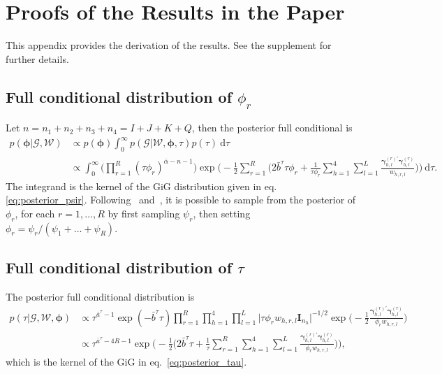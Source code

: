 \documentclass[12pt,a4paper]{article}
\newcommand*\abs[1]{\big|#1\big|}					%
\theoremstyle{custom}
\begin{document}
\section{Proofs of the Results in the Paper} \label{sec:apdx_proofs}
This appendix provides the derivation of the results. See the supplement for further details.

\subsection{Full conditional distribution of $\phi_r$} \label{sec:posterior_phi_r}
Let $n= n_1+n_2+n_3+n_4 = I+J+K+Q$, then the posterior full conditional is
\begin{align*}
p(\boldsymbol{\phi}| \mathcal{G}, \mathcal{W}) & \propto p(\boldsymbol{\phi}) \int_0^\infty p(\mathcal{G}|\mathcal{W},\boldsymbol{\phi}, \tau) p(\tau) \: \mathrm{d}\tau \\
 & \propto \int_0^\infty \Big( \prod_{r=1}^R (\tau \phi_r)^{\bar{\alpha}-n-1} \Big) \exp \bigg( -\frac{1}{2} \sum_{r=1}^R \Big( 2\bar{b}^\tau \tau\phi_r + \frac{1}{\tau\phi_r} \sum_{h=1}^4 \sum_{l=1}^L \frac{\boldsymbol{\gamma}_{h,l}^{(r)\prime} \boldsymbol{\gamma}_{h,l}^{(r)}}{w_{h,r,l}} \Big) \bigg) \: \mathrm{d}\tau.
\end{align*}
The integrand is the kernel of the GiG distribution given in eq. \eqref{eq:posterior_psir}. Following~\cite{GuhaniyogiDunson17BayesTensorReg} and~\cite{Kruijer10AdaptiveBayesDensityEstimation_LocationScaleMixtures}, it is possible to sample from the posterior of $\phi_r$, for each $r=1,\ldots,R$ by first sampling $\psi_r$, then setting $\phi_r = \psi_r / (\psi_1 + \ldots + \psi_R)$.




\subsection{Full conditional distribution of $\tau$} \label{sec:posterior_tau}
The posterior full conditional distribution is
\begin{align*}
p(\tau| \mathcal{G}, \mathcal{W}, \boldsymbol{\phi}) & \propto \tau^{\bar{a}^\tau -1} \exp(-\bar{b}^\tau \tau) \prod_{r=1}^R \prod_{h=1}^4 \prod_{l=1}^L \abs{\tau \phi_r w_{h,r,l} \mathbf{I}_{n_h}}^{-1/2} \exp \Big( -\frac{1}{2} \frac{\boldsymbol{\gamma}_{h,l}^{(r)\prime} \boldsymbol{\gamma}_{h,l}^{(r)}}{\phi_r w_{h,r,l}} \Big) \\
 & \propto \tau^{\bar{a}^\tau -4R-1} \exp\Bigg( -\frac{1}{2} \bigg( 2 \bar{b}^\tau \tau + \frac{1}{\tau} \sum_{r=1}^R \sum_{h=1}^4 \sum_{l=1}^L \frac{\boldsymbol{\gamma}_{h,l}^{(r)\prime} \boldsymbol{\gamma}_{h,l}^{(r)}}{\phi_r w_{h,r,l}} \bigg) \Bigg) ,
\end{align*}
which is the kernel of the GiG in eq.~\eqref{eq:posterior_tau}.
\end{document}
